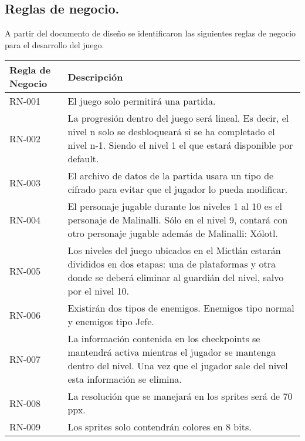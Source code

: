 \subsection{Reglas de negocio.}
A partir del documento de diseño se identificaron las siguientes reglas de negocio para el desarrollo del juego. 
\begin{longtable}[c]{ | m{5cm} | m{10cm}|} 
		\hline
		\rowcolor{cyan}Regla de Negocio & Descripción \\ 
		\hline
		RN-001\label{RN:01} & El juego solo permitirá una partida. \\ 
		\hline
		RN-002\label{RN:02} & La progresión dentro del juego será lineal. Es decir, el nivel n solo se desbloqueará si se ha completado el nivel n-1. Siendo el nivel 1 el que estará disponible por default.\\ 
		\hline
		RN-003\label{RN:03} & El archivo de datos de la partida usara un tipo de cifrado para evitar que el jugador lo pueda modificar.\\ 
		\hline
		RN-004\label{RN:04} & El personaje jugable durante los niveles 1 al 10 es el personaje de Malinalli. Sólo en el nivel 9, contará con otro personaje jugable además de Malinalli: Xólotl. \\ 
		\hline
		RN-005\label{RN:05} & Los niveles del juego ubicados en el Mictlán estarán divididos en dos etapas: una de plataformas y otra donde se deberá eliminar al guardián del nivel, salvo por el nivel 10. \\ 
		\hline
		RN-006\label{RN:06} & Existirán dos tipos de enemigos. Enemigos tipo normal y enemigos tipo Jefe. \\ 
		\hline
		RN-007\label{RN:07} & La información contenida en los checkpoints se mantendrá activa mientras el jugador se mantenga dentro del nivel. Una vez que el jugador sale del nivel esta información se elimina.\\ 
		\hline
		RN-008\label{RN:08} & La resolución que se manejará en los sprites será de 70 ppx.\\ 
		\hline
		RN-009\label{RN:09} & Los sprites solo contendrán colores en 8 bits.\\ 
		\hline

\end{longtable}
